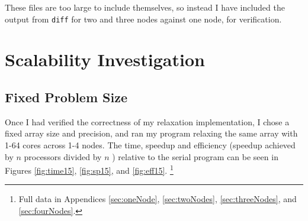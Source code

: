 \documentclass[12pt]{article}
\begin{document}
These files are too large to include themselves, so instead I have included the output from \texttt{diff} for two and three nodes against one node, for verification.

\clearpage
\section{Scalability Investigation}

\subsection{Fixed Problem Size}
Once I had verified the correctness of my relaxation implementation, I chose a fixed array size and precision, and ran my program relaxing the same array with 1-64 cores across 1-4 nodes.  The time, speedup and efficiency (speedup achieved by $n$ processors divided by $n$ \citep{speedup}) relative to the serial program can be seen in Figures \ref{fig:time15}, \ref{fig:sp15}, and \ref{fig:eff15}. \footnote{Full data in Appendices \ref{sec:oneNode}, \ref{sec:twoNodes}, \ref{sec:threeNodes}, and  \ref{sec:fourNodes}.}
\end{document}
